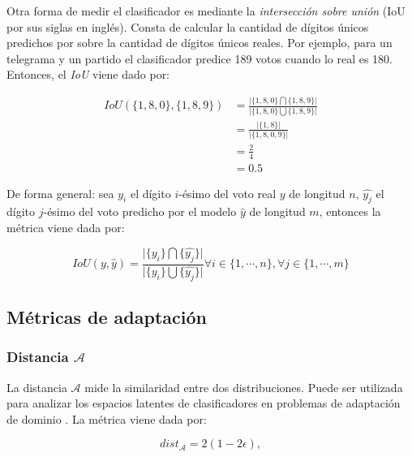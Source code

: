 Otra forma de medir el clasificador es mediante la {\it intersección sobre unión} (IoU por sus siglas en inglés).
Consta de calcular la cantidad de dígitos únicos predichos por sobre la cantidad de dígitos únicos reales. Por ejemplo,
para un telegrama y un partido el clasificador predice 189 votos cuando lo real es 180. Entonces, el {\it IoU} viene
dado por:

\begin{align}
    IoU(\{1, 8, 0\}, \{1, 8, 9\}) & = \frac{\lvert\{1, 8, 0\} \bigcap \{1, 8, 9\}\rvert}{\lvert\{1, 8, 0\} \bigcup \{1, 8, 9\}\rvert} \nonumber \\
                                  & = \frac{\lvert\{1, 8\}\rvert}{\lvert\{1, 8, 0, 9\}\rvert}                                         \nonumber \\
                                  & = \frac{2}{4}                                                                     \nonumber                 \\
                                  & = 0.5
\end{align}

\noindent
De forma general: sea $y_{i}$ el dígito $i$-ésimo del voto real $y$ de longitud $n$, $\hat{y_{j}}$ el dígito $j$-ésimo
del voto predicho por el modelo $\hat{y}$ de longitud $m$, entonces la métrica viene dada por:

\begin{equation}
    IoU(y, \hat{y}) = \frac{\lvert \{y_{i}\} \bigcap \{\hat{y_{j}}\}\rvert}{\lvert \{y_{i}\} \bigcup \{\hat{y_{j}}\}\rvert} \forall i \in \{1, \cdots, n\}, \forall j \in \{1, \cdots, m\}
\end{equation}

\subsection{Métricas de adaptación}
\subsubsection{Distancia $\mathcal{A}$}

La distancia $\mathcal{A}$ mide la similaridad entre dos distribuciones. Puede ser utilizada para analizar los espacios
latentes de clasificadores en problemas de adaptación de dominio \parencite{ben2006analysis}. La métrica viene dada por:

\begin{equation}
    dist_\mathcal{A} = 2 (1-2\epsilon),
\end{equation}

